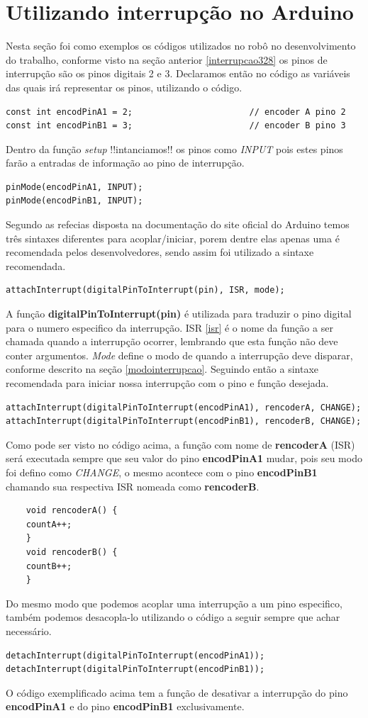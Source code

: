 \documentclass[a4paper,12pt,portuguese]{ufms-cpcx}
\begin{document}
\section{Utilizando interrupção no Arduino}\label{usointerrupcao}
Nesta seção foi como exemplos os códigos utilizados no robô no desenvolvimento do trabalho, conforme visto na seção anterior \ref{interrupcao328} os pinos de interrupção são os pinos digitais 2 e 3. Declaramos então no código as variáveis das quais irá representar os pinos, utilizando o código.
\begin{lstlisting}
const int encodPinA1 = 2;                       // encoder A pino 2
const int encodPinB1 = 3;                       // encoder B pino 3
\end{lstlisting}
Dentro da função \textit{setup} !!intanciamos!! os pinos como \textit{INPUT} pois estes pinos farão a entradas de informação ao pino de interrupção.
\begin{lstlisting}
pinMode(encodPinA1, INPUT);
pinMode(encodPinB1, INPUT);
\end{lstlisting}
Segundo as refecias disposta na documentação do site oficial do Arduino temos três sintaxes diferentes para acoplar\//iniciar, porem dentre elas apenas uma é recomendada pelos desenvolvedores, sendo assim foi utilizado a sintaxe recomendada.
\begin{lstlisting}
attachInterrupt(digitalPinToInterrupt(pin), ISR, mode);
\end{lstlisting}
A função \textbf{digitalPinToInterrupt(pin)} é utilizada para traduzir o pino digital para o numero especifico da interrupção.
ISR \ref{isr} é o nome da função a ser chamada quando a interrupção ocorrer, lembrando que esta função não deve conter argumentos.
\textit{Mode} define o modo de quando a interrupção deve disparar, conforme descrito na seção \ref{modointerrupcao}.
Seguindo então a sintaxe recomendada para iniciar nossa interrupção com o pino e função desejada.
\begin{lstlisting}
attachInterrupt(digitalPinToInterrupt(encodPinA1), rencoderA, CHANGE);
attachInterrupt(digitalPinToInterrupt(encodPinB1), rencoderB, CHANGE);
\end{lstlisting}
Como pode ser visto no código acima, a função com nome de \textbf{rencoderA} (ISR) será executada sempre que seu valor do pino \textbf{encodPinA1} mudar, pois seu modo foi defino como \textit{CHANGE}, o mesmo acontece com o pino \textbf{encodPinB1} chamando sua respectiva ISR nomeada como \textbf{rencoderB}. 
\begin{lstlisting}
	void rencoderA() {
	countA++;
	}
	void rencoderB() {
	countB++;
	}
\end{lstlisting}
Do mesmo modo que podemos acoplar uma interrupção a um pino especifico, também podemos desacopla-lo utilizando o código a seguir sempre que achar necessário.
\begin{lstlisting}
detachInterrupt(digitalPinToInterrupt(encodPinA1));
detachInterrupt(digitalPinToInterrupt(encodPinB1));
\end{lstlisting}
O código exemplificado acima tem a função de desativar a interrupção do pino \textbf{encodPinA1} e do pino \textbf{encodPinB1} exclusivamente.
\end{document}
